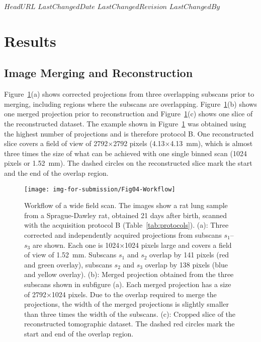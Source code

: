 \svnidlong
{$HeadURL$}
{$LastChangedDate$}
{$LastChangedRevision$}
{$LastChangedBy$}
%
\section{Results}\label{sec:Results}
\subsection{Image Merging and Reconstruction}\label{sec:Image Merging and Reconstruction}
Figure~\ref{fig:wide-field-scan-results}(a) shows corrected projections from three overlapping subscans prior to merging, including regions where the subscans are overlapping. Figure~\ref{fig:wide-field-scan-results}(b) shows one merged projection prior to reconstruction and Figure~\ref{fig:wide-field-scan-results}(c) shows one slice of the reconstructed dataset. The example shown in Figure~\ref{fig:wide-field-scan-results} was obtained using the highest number of projections and is therefore protocol B. One reconstructed slice covers a field of view of 2792$\times$2792 pixels (4.13$\times$\SI{4.13}{\milli\meter}), which is almost three times the size of what can be achieved with one single binned scan (1024 pixels or \SI{1.52}{\milli\meter}). %
The dashed circles on the reconstructed slice mark the start and the end of the overlap region.

\begin{figure}
	\centering
	\caption{Workflow of a wide field scan. The images show a rat lung sample from a Sprague-Dawley rat, obtained 21 days after birth, scanned with the acquisition protocol B (Table~\ref{tab:protocols}). %
			(a): Three corrected and independently acquired projections from subscans $s_1$--$s_3$ are shown. Each one is 1024\(\times\)1024 pixels large and covers a field of view of \SI{1.52}{\milli\meter}. Subscans $s_1$ and $s_2$ overlap by 141 pixels (red and green overlay), subscans $s_2$ and $s_3$ overlap by 138 pixels (blue and yellow overlay). %
			(b): Merged projection obtained from the three subscans shown in subfigure (a). Each merged projection has a size of 2792\(\times\)1024 pixels. Due to the overlap required to merge the projections, the width of the merged projections is slightly smaller than three times the width of the subscans. %
			(c): Cropped slice of the reconstructed tomographic dataset. The dashed red circles mark the start and end of the overlap region.}
	\texttt{[image: img-for-submission/Fig04-Workflow]}
	\label{fig:wide-field-scan-results}
\end{figure}

